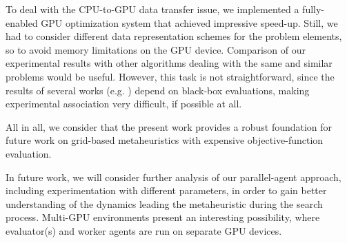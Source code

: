 To deal with the CPU-to-GPU data transfer issue, we implemented a
fully-enabled GPU optimization system that achieved impressive speed-up.
Still, we had to consider different data representation schemes for
the problem elements, so to avoid memory limitations on the GPU device.
Comparison of our experimental results with other algorithms dealing
with the same and similar problems would be useful. However, this
task is not straightforward, since the results of several works (e.g.
\cite{Gerdenitsch_PhD:2004,Turke_Advanced.site.configuration.techniques:2005})
depend on black-box evaluations, making experimental association very
difficult, if possible at all. 

All in all, we consider that the present work provides a robust foundation
for future work on grid-based metaheuristics with expensive objective-function
evaluation.

In future work, we will consider further analysis of our parallel-agent
approach, including experimentation with different parameters, in
order to gain better understanding of the dynamics leading the metaheuristic
during the search process. Multi-GPU environments present an interesting
possibility, where evaluator(s) and worker agents are run on separate
GPU devices.
